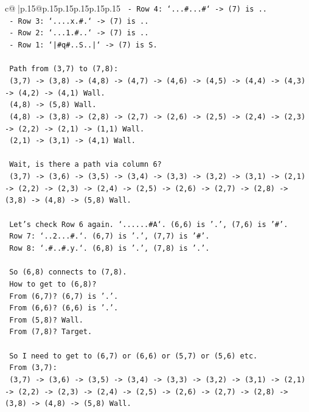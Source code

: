 \documentclass{article}
\begin{document}
{\begin{supertabular}{c@{$\;$}|p{.15\linewidth}@{}p{.15\linewidth}p{.15\linewidth}p{.15\linewidth}p{.15\linewidth}p{.15\linewidth}}
{{{\texttt{  {-} Row 4: `...\#...\#` {-}> (7) is ..} \\
\texttt{  {-} Row 3: `....x.\#.` {-}> (7) is ..} \\
\texttt{  {-} Row 2: `...1.\#..` {-}> (7) is ..} \\
\texttt{  {-} Row 1: `|\#q\#..S..|` {-}> (7) is S.} \\
\\ 
\texttt{  Path from (3,7) to (7,8):} \\
\texttt{  (3,7) {-}> (3,8) {-}> (4,8) {-}> (4,7) {-}> (4,6) {-}> (4,5) {-}> (4,4) {-}> (4,3) {-}> (4,2) {-}> (4,1) Wall.} \\
\texttt{  (4,8) {-}> (5,8) Wall.} \\
\texttt{  (4,8) {-}> (3,8) {-}> (2,8) {-}> (2,7) {-}> (2,6) {-}> (2,5) {-}> (2,4) {-}> (2,3) {-}> (2,2) {-}> (2,1) {-}> (1,1) Wall.} \\
\texttt{  (2,1) {-}> (3,1) {-}> (4,1) Wall.} \\
\\ 
\texttt{  Wait, is there a path via column 6?} \\
\texttt{  (3,7) {-}> (3,6) {-}> (3,5) {-}> (3,4) {-}> (3,3) {-}> (3,2) {-}> (3,1) {-}> (2,1) {-}> (2,2) {-}> (2,3) {-}> (2,4) {-}> (2,5) {-}> (2,6) {-}> (2,7) {-}> (2,8) {-}> (3,8) {-}> (4,8) {-}> (5,8) Wall.} \\
\\ 
\texttt{  Let's check Row 6 again. `......\#A`. (6,6) is '.', (7,6) is '\#'.} \\
\texttt{  Row 7: `..2...\#.`. (6,7) is '.', (7,7) is '\#'.} \\
\texttt{  Row 8: `.\#..\#.y.`. (6,8) is '.', (7,8) is '.'.} \\
\\ 
\texttt{  So (6,8) connects to (7,8).} \\
\texttt{  How to get to (6,8)?} \\
\texttt{  From (6,7)? (6,7) is '.'.} \\
\texttt{  From (6,6)? (6,6) is '.'.} \\
\texttt{  From (5,8)? Wall.} \\
\texttt{  From (7,8)? Target.} \\
\\ 
\texttt{  So I need to get to (6,7) or (6,6) or (5,7) or (5,6) etc.} \\
\texttt{  From (3,7):} \\
\texttt{  (3,7) {-}> (3,6) {-}> (3,5) {-}> (3,4) {-}> (3,3) {-}> (3,2) {-}> (3,1) {-}> (2,1) {-}> (2,2) {-}> (2,3) {-}> (2,4) {-}> (2,5) {-}> (2,6) {-}> (2,7) {-}> (2,8) {-}> (3,8) {-}> (4,8) {-}> (5,8) Wall.} \\
}}}
\end{supertabular}}
\end{document}
